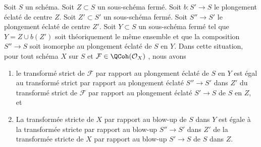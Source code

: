 \begin{lemma}
\label{lemma-strict-transform-composition-blowups}
Soit  $S$  un schéma. Soit  $Z \subset S$  un sous-schéma fermé. Soit
 $b : S' \to S$  le plongement éclaté de centre  $Z$. Soit  $Z' \subset S'$  un
sous-schéma fermé. Soit  $S'' \to S'$  le plongement éclaté de centre  $Z'$.
Soit  $Y \subset S$  un sous-schéma fermé tel que  $Y = Z \cup b(Z')$  soit théoriquement le
même ensemble et que la composition  $S'' \to S$  soit isomorphe au plongement
éclaté de  $S$  en  $Y$. Dans cette situation, pour tout schéma
 $X$  sur  $S$  et  $\mathcal{F} \in \QCoh(\mathcal{O}_X)$ , nous avons
\begin{enumerate}
\item le transformé strict de  $\mathcal{F}$  par rapport au plongement éclaté de
 $S$  en  $Y$  est égal au transformé strict par rapport au
plongement éclaté  $S'' \to S'$  dans  $Z'$  du transformé strict de
 $\mathcal{F}$  par rapport au plongement éclaté  $S' \to S$  de  $S$  en
 $Z$, et
\item La transformée stricte de  $X$  par rapport au blow-up de  $S$  dans
 $Y$  est égale à la transformée stricte par rapport au blow-up
 $S'' \to S'$  dans  $Z'$  de la transformée stricte de  $X$  par
rapport au blow-up  $S' \to S$  de  $S$  dans  $Z$.
\end{enumerate}
\end{lemma}

